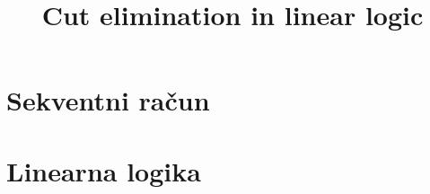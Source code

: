 \documentclass[mat1, tisk]{fmfdelo}
\title{Cut elimination in linear logic}
\begin{document}

\section{Sekventni račun}


\section{Linearna logika}


\end{document}
